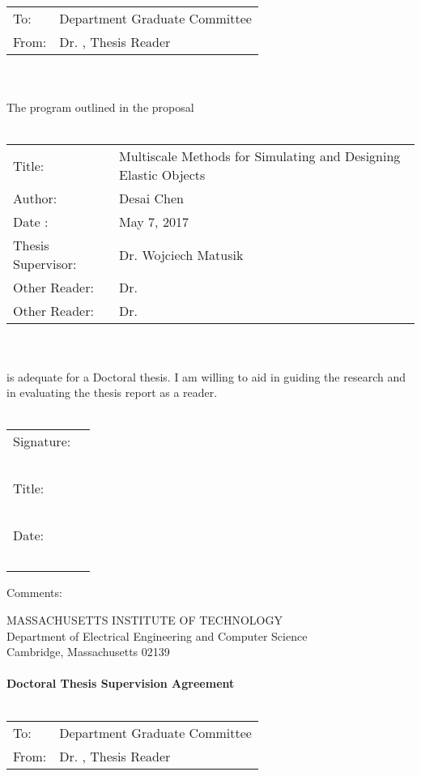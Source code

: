 \documentclass[11pt]{article}
\begin{document}
\begin{tabular}{p{2cm} p{10cm}}
	To: & Department Graduate Committee \\
	From: & Dr. , Thesis Reader
\end{tabular}\\~\\
The program outlined in the proposal\\~\\
\begin{tabular}{p{4cm} l}
	Title: & Multiscale Methods for Simulating and Designing Elastic Objects\\
	Author: & Desai Chen\\
	Date : & May 7, 2017 \\
	Thesis Supervisor: & Dr. Wojciech Matusik\\
	Other Reader: & Dr.\\
	Other Reader: & Dr.
\end{tabular}\\~\\
is adequate for a Doctoral thesis. I am willing to aid in guiding the research and in
evaluating the thesis report as a reader.\\~\\
\begin{flushright}
	\begin{tabular}{l l}
		Signature: & \underline{\hspace{6cm}}\\~\\
		Title: & \underline{\hspace{6cm}}\\~\\
		Date: & \underline{\hspace{6cm}}\\~\\
	\end{tabular}
\end{flushright}
Comments:
\newpage
\begin{center}
	MASSACHUSETTS INSTITUTE OF TECHNOLOGY\\
	Department of Electrical Engineering and Computer Science\\
	Cambridge, Massachusetts 02139\\~\\
	\textbf{Doctoral Thesis Supervision Agreement}\\~\\
\end{center}
\begin{tabular}{p{2cm} p{10cm}}
	To: & Department Graduate Committee \\
	From: & Dr. , Thesis Reader
\end{tabular}\\~\\
\end{document}
